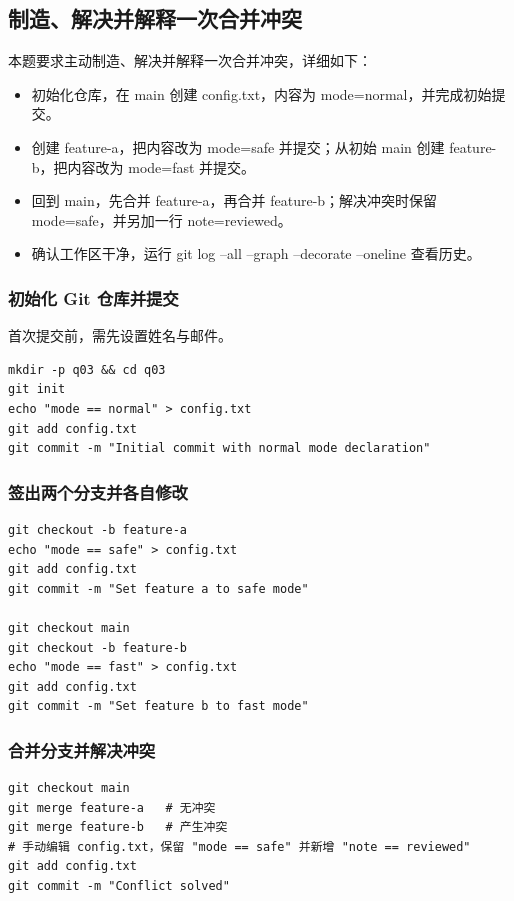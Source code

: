 \subsection{制造、解决并解释一次合并冲突}
本题要求主动制造、解决并解释一次合并冲突，详细如下：
\begin{itemize}
    \item 初始化仓库，在 main 创建 config.txt，内容为 mode=normal，并完成初始提交。
    \item 创建 feature-a，把内容改为 mode=safe 并提交；从初始 main 创建 feature-b，把内容改为 mode=fast 并提交。
    \item 回到 main，先合并 feature-a，再合并 feature-b；解决冲突时保留 mode=safe，并另加一行 note=reviewed。
    \item 确认工作区干净，运行 git log --all --graph --decorate --oneline 查看历史。
\end{itemize}

\subsubsection*{初始化 Git 仓库并提交}
首次提交前，需先设置姓名与邮件。
\begin{verbatim}
mkdir -p q03 && cd q03
git init
echo "mode == normal" > config.txt
git add config.txt
git commit -m "Initial commit with normal mode declaration"
\end{verbatim}

\subsubsection*{签出两个分支并各自修改}
\begin{verbatim}
git checkout -b feature-a
echo "mode == safe" > config.txt
git add config.txt
git commit -m "Set feature a to safe mode"

git checkout main
git checkout -b feature-b
echo "mode == fast" > config.txt
git add config.txt
git commit -m "Set feature b to fast mode"
\end{verbatim}

\subsubsection*{合并分支并解决冲突}
\begin{verbatim}
git checkout main
git merge feature-a   # 无冲突
git merge feature-b   # 产生冲突
# 手动编辑 config.txt，保留 "mode == safe" 并新增 "note == reviewed"
git add config.txt
git commit -m "Conflict solved"
\end{verbatim}

